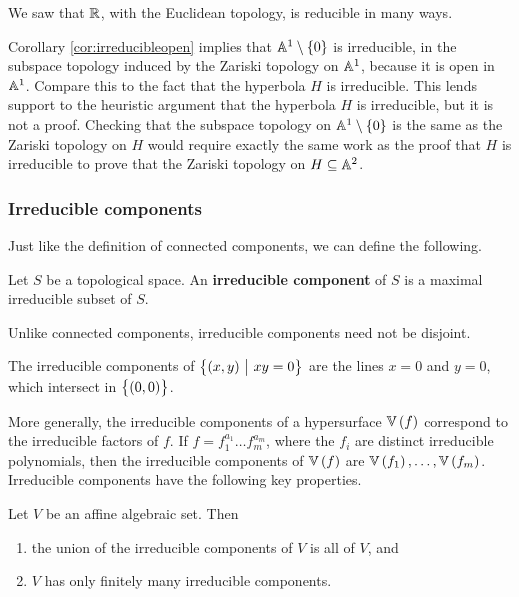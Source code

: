 \begin{example*}
We saw that $ \RR $, with the Euclidean topology, is reducible in many ways.
\end{example*}

Corollary \ref{cor:irreducibleopen} implies that $ \AA^1 \setminus \cbr{0} $ is irreducible, in the subspace topology induced by the Zariski topology on $ \AA^1 $, because it is open in $ \AA^1 $. Compare this to the fact that the hyperbola $ H $ is irreducible. This lends support to the heuristic argument that the hyperbola $ H $ is irreducible, but it is not a proof. Checking that the subspace topology on $ \AA^1 \setminus \cbr{0} $ is the same as the Zariski topology on $ H $ would require exactly the same work as the proof that $ H $ is irreducible to prove that the Zariski topology on $ H \subseteq \AA^2 $.

\subsubsection{Irreducible components}

Just like the definition of connected components, we can define the following.

\begin{definition*}
Let $ S $ be a topological space. An \textbf{irreducible component} of $ S $ is a maximal irreducible subset of $ S $.
\end{definition*}

Unlike connected components, irreducible components need not be disjoint.

\begin{example*}
The irreducible components of $ \cbr{\br{x, y} \st xy = 0} $ are the lines $ x = 0 $ and $ y = 0 $, which intersect in $ \cbr{\br{0, 0}} $.
\end{example*}

More generally, the irreducible components of a hypersurface $ \VV\br{f} $ correspond to the irreducible factors of $ f $. If $ f = f_1^{a_1} \dots f_m^{a_m} $, where the $ f_i $ are distinct irreducible polynomials, then the irreducible components of $ \VV\br{f} $ are $ \VV\br{f_1}, \dots, \VV\br{f_m} $. Irreducible components have the following key properties.

\pagebreak

\begin{proposition}
\label{prop:irreduciblecomponent}
Let $ V $ be an affine algebraic set. Then
\begin{enumerate}
\item the union of the irreducible components of $ V $ is all of $ V $, and
\item $ V $ has only finitely many irreducible components.
\end{enumerate}
\end{proposition}


